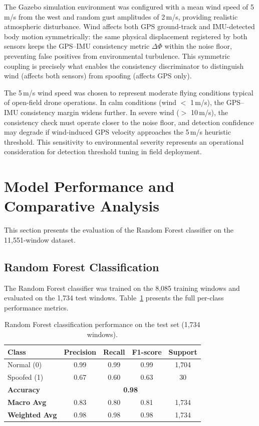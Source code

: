 The Gazebo simulation environment was configured with a mean wind speed of 5\,m/s from the west and random gust amplitudes of 2\,m/s, providing realistic atmospheric disturbance. Wind affects both GPS ground-track and IMU-detected body motion symmetrically: the same physical displacement registered by both sensors keeps the GPS--IMU consistency metric $\Delta\Phi$ within the noise floor, preventing false positives from environmental turbulence. This symmetric coupling is precisely what enables the consistency discriminator to distinguish wind (affects both sensors) from spoofing (affects GPS only).

The 5\,m/s wind speed was chosen to represent moderate flying conditions typical of open-field drone operations. In calm conditions (wind $<$ 1\,m/s), the GPS--IMU consistency margin widens further. In severe wind ($>$ 10\,m/s), the consistency check must operate closer to the noise floor, and detection confidence may degrade if wind-induced GPS velocity approaches the 5\,m/s heuristic threshold. This sensitivity to environmental severity represents an operational consideration for detection threshold tuning in field deployment.

\section{Model Performance and Comparative Analysis}

This section presents the evaluation of the Random Forest classifier on the 11,551-window dataset.

\subsection{Random Forest Classification}

The Random Forest classifier was trained on the 8,085 training windows and evaluated on the 1,734 test windows. Table~\ref{tab:rf_perf} presents the full per-class performance metrics.

\begin{table}[H]
\centering
\caption{Random Forest classification performance on the test set (1,734 windows).}
\label{tab:rf_perf}
\begin{tabular}{@{}lcccc@{}}
\toprule
\textbf{Class} & \textbf{Precision} & \textbf{Recall} & \textbf{F1-score} & \textbf{Support} \\
\midrule
Normal (0)  & 0.99 & 0.99 & 0.99 & 1,704 \\
Spoofed (1) & 0.67 & 0.60 & 0.63 & 30 \\
\midrule
\textbf{Accuracy} & \multicolumn{4}{c}{\textbf{0.98}} \\
\textbf{Macro Avg} & 0.83 & 0.80 & 0.81 & 1,734 \\
\textbf{Weighted Avg} & 0.98 & 0.98 & 0.98 & 1,734 \\
\bottomrule
\end{tabular}
\end{table}

